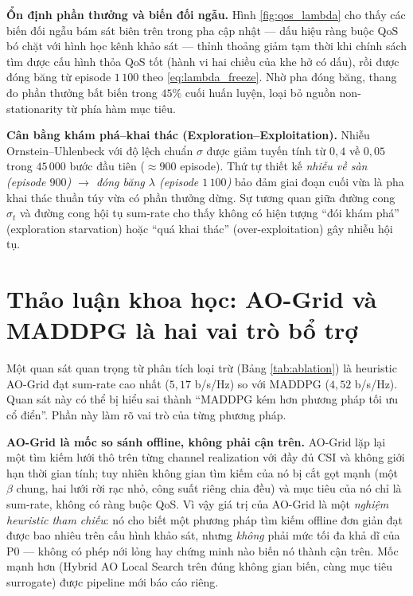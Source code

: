 \textbf{Ổn định phần thưởng và biến đối ngẫu.} Hình \ref{fig:qos_lambda}
cho thấy các biến đối ngẫu bám sát biên trên trong pha cập nhật ---
dấu hiệu ràng buộc QoS bó chặt với hình học kênh khảo sát --- thỉnh
thoảng giảm tạm thời khi chính sách tìm được cấu hình thỏa QoS tốt
(hành vi hai chiều của khe hở có dấu), rồi được đóng băng từ episode
$1\,100$ theo \eqref{eq:lambda_freeze}. Nhờ pha đóng băng, thang đo
phần thưởng bất biến trong $45\%$ cuối huấn luyện, loại bỏ nguồn
non-stationarity từ phía hàm mục tiêu.

\textbf{Cân bằng khám phá--khai thác (Exploration--Exploitation).}
Nhiễu Ornstein--Uhlenbeck với độ lệch chuẩn $\sigma$ được giảm tuyến
tính từ $0{,}4$ về $0{,}05$ trong $45\,000$ bước đầu tiên ($\approx
900$ episode). Thứ tự thiết kế \emph{nhiễu về sàn (episode $900$)
$\to$ đóng băng $\lambda$ (episode $1\,100$)} bảo đảm giai đoạn cuối
vừa là pha khai thác thuần túy vừa có phần thưởng dừng. Sự tương quan
giữa đường cong $\sigma_t$ và đường cong hội tụ sum-rate cho thấy
không có hiện tượng ``đói khám phá'' (exploration starvation) hoặc
``quá khai thác'' (over-exploitation) gây nhiễu hội tụ.

\section{Thảo luận khoa học: AO-Grid và MADDPG là hai vai trò bổ trợ}
\label{sec:scientific_discussion}

Một quan sát quan trọng từ phân tích loại trừ (Bảng \ref{tab:ablation})
là heuristic AO-Grid đạt sum-rate cao nhất ($5{,}17$ b/s/Hz) so với
MADDPG ($4{,}52$ b/s/Hz). Quan sát này có thể bị hiểu sai thành
``MADDPG kém hơn phương pháp tối ưu cổ điển''. Phần này làm rõ vai trò
của từng phương pháp.

\textbf{AO-Grid là mốc so sánh offline, không phải cận trên.} AO-Grid
lặp lại một tìm kiếm lưới thô trên từng channel realization với đầy đủ
CSI và không giới hạn thời gian tính; tuy nhiên không gian tìm kiếm
của nó bị cắt gọt mạnh (một $\beta$ chung, hai lưới rời rạc nhỏ, công
suất riêng chia đều) và mục tiêu của nó chỉ là sum-rate, không có ràng
buộc QoS. Vì vậy giá trị của AO-Grid là một \emph{nghiệm heuristic
tham chiếu}: nó cho biết một phương pháp tìm kiếm offline đơn giản đạt
được bao nhiêu trên cấu hình khảo sát, nhưng \emph{không} phải mức tối
đa khả dĩ của P0 --- không có phép nới lỏng hay chứng minh nào biến nó
thành cận trên. Mốc mạnh hơn (Hybrid AO Local Search trên đúng không
gian biến, cùng mục tiêu surrogate) được pipeline mới báo cáo riêng.

